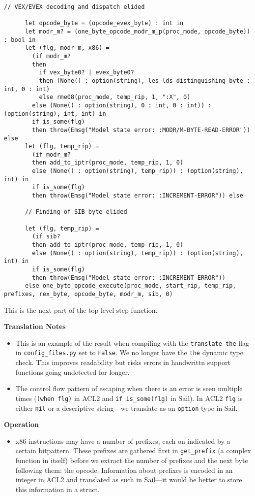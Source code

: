 \documentclass[a4paper]{article}
\begin{document}
\begin{tcolorbox}[breakable]
\begin{parcolumns}{2}
{\begin{lstlisting}[language=sail]
      // VEX/EVEX decoding and dispatch elided

      let opcode_byte = (opcode_evex_byte) : int in
      let modr_m? = (one_byte_opcode_modr_m_p(proc_mode, opcode_byte)) : bool in
      let (flg, modr_m, x86) =
        (if modr_m?
        then
          if vex_byte0? | evex_byte0?
          then (None() : option(string), les_lds_distinguishing_byte : int, 0 : int)
          else rme08(proc_mode, temp_rip, 1, ":X", 0)
        else (None() : option(string), 0 : int, 0 : int)) : (option(string), int, int) in
        if is_some(flg)
        then throw(Emsg("Model state error: :MODR/M-BYTE-READ-ERROR")) else
      let (flg, temp_rip) =
        (if modr_m?
        then add_to_iptr(proc_mode, temp_rip, 1, 0)
        else (None() : option(string), temp_rip)) : (option(string), int) in
        if is_some(flg)
        then throw(Emsg("Model state error: :INCREMENT-ERROR")) else

      // Finding of SIB byte elided

      let (flg, temp_rip) =
        (if sib?
        then add_to_iptr(proc_mode, temp_rip, 1, 0)
        else (None() : option(string), temp_rip)) : (option(string), int) in
        if is_some(flg)
        then throw(Emsg("Model state error: :INCREMENT-ERROR"))
      else one_byte_opcode_execute(proc_mode, start_rip, temp_rip, prefixes, rex_byte, opcode_byte, modr_m, sib, 0)
\end{lstlisting}
}
\colplacechunks
\end{parcolumns}

This is the next part of the top level step function.

\noindent
\textbf{Translation Notes}
\begin{itemize}
  \item This is an example of the result when compiling with the \texttt{translate\_the} flag in \texttt{config\_files.py} set to \texttt{False}.  We no longer have the \texttt{the} dynamic type check.  This improves readability but risks errors in handwrittn support functions going undetected for longer.

  \item The control flow pattern of escaping when there is an error is seen multiple times (\texttt{(when flg)} in ACL2 and \texttt{if is\_some(flg)} in Sail).  In ACL2 \texttt{flg} is either \texttt{nil} or a descriptive string---we translate as an \texttt{option} type in Sail.
\end{itemize}

\noindent
\textbf{Operation}
\begin{itemize}
  \item x86 instructions may have a number of prefixes, each on indicated by a certain bitpattern.  These prefixes are gathered first in \texttt{get\_prefix} (a complex function in itself) before we extract the number of prefixes and the next byte following them: the opcode.  Information about prefixes is encoded in an integer in ACL2 and translated as such in Sail---it would be better to store this information in a struct.


\end{itemize}
\end{tcolorbox}
\end{document}
